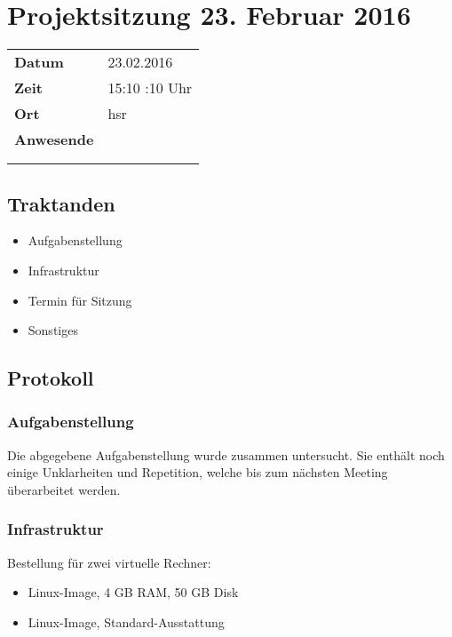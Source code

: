 \documentclass[class=scrbook,crop=false]{standalone}
\begin{document}
	
	\section{Projektsitzung 23. Februar 2016}
	
	\begin{tabular}{ll}
		\textbf{Datum} & 23.02.2016 \\
		\textbf{Zeit} & 15:10 \textendash 16:10 Uhr \\
		\textbf{Ort} & \acs{hsr} \\
		\textbf{Anwesende} & \proff \\ & \ubos \\ & \pchr
	\end{tabular}
	
	\subsection*{Traktanden}
	\begin{itemize}
		\item Aufgabenstellung
		\item Infrastruktur
		\item Termin für Sitzung
		\item Sonstiges
	\end{itemize}
	
	\subsection*{Protokoll}

	\subsubsection*{Aufgabenstellung}
	
    Die abgegebene Aufgabenstellung wurde zusammen untersucht. Sie enthält noch einige Unklarheiten und Repetition, welche bis zum nächsten Meeting überarbeitet werden.

	\subsubsection*{Infrastruktur}
	
	Bestellung für zwei virtuelle Rechner:
	
	\begin{itemize}
		\item Linux-Image, 4 GB RAM, 50 GB Disk
		\item Linux-Image, Standard-Ausstattung
	\end{itemize}
	
\end{document}
